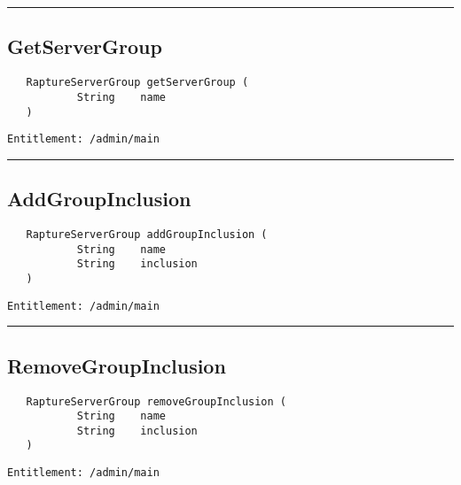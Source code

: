 \rule{12cm}{2pt}
\subsection{GetServerGroup}
\label{Api:GetServerGroup}
\begin{verbatim}
   RaptureServerGroup getServerGroup (
           String    name
   )
\end{verbatim}
\begin{Verbatim}[fontsize=\small, formatcom=\color{Maroon}]
  Entitlement: /admin/main
\end{Verbatim}



\rule{12cm}{2pt}
\subsection{AddGroupInclusion}
\label{Api:AddGroupInclusion}
\begin{verbatim}
   RaptureServerGroup addGroupInclusion (
           String    name
           String    inclusion
   )
\end{verbatim}
\begin{Verbatim}[fontsize=\small, formatcom=\color{Maroon}]
  Entitlement: /admin/main
\end{Verbatim}



\rule{12cm}{2pt}
\subsection{RemoveGroupInclusion}
\label{Api:RemoveGroupInclusion}
\begin{verbatim}
   RaptureServerGroup removeGroupInclusion (
           String    name
           String    inclusion
   )
\end{verbatim}
\begin{Verbatim}[fontsize=\small, formatcom=\color{Maroon}]
  Entitlement: /admin/main
\end{Verbatim}



